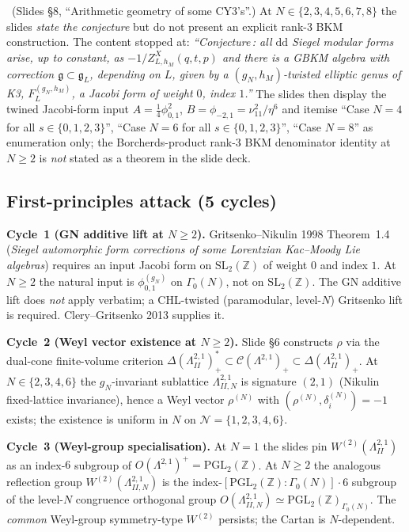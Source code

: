 \ClaimStatusConjectured\ (Slides \S 8, ``Arithmetic geometry of some
CY3's''.) At $N \in \{2, 3, 4, 5, 6, 7, 8\}$ the slides \emph{state the
conjecture} but do not present an explicit rank-$3$ BKM construction.
The content stopped at:
\emph{``Conjecture\,: all $\mathrm{dd}$ Siegel modular forms arise, up to
constant, as $-1/Z^X_{L, h_M}(q, t, p)$ and there is a GBKM algebra with
correction $\mathfrak{g} \subset \mathfrak{g}_L$, depending on $L$,
given by a $(g_N, h_M)$-twisted elliptic genus of K3,
$F^{(g_N, h_M)}_L$, a Jacobi form of weight $0$, index $1$.''}
The slides then display the twined Jacobi-form input
$A = \tfrac{1}{4} \phi^2_{0,1}$, $B = \phi_{-2,1} = \nu_{11}^2/\eta^6$
and itemise ``Case $N = 4$ for all $s \in \{0,1,2,3\}$'', ``Case $N = 6$
for all $s \in \{0,1,2,3\}$'', ``Case $N = 8$'' as enumeration only;
the Borcherds-product rank-$3$ BKM denominator identity at $N \geq 2$ is
\emph{not} stated as a theorem in the slide deck.

\subsection*{First-principles attack (5 cycles)}

\noindent\textbf{Cycle~1 (GN additive lift at $N \geq 2$).} Gritsenko--Nikulin
1998 Theorem~1.4 (\emph{Siegel automorphic form corrections of some
Lorentzian Kac--Moody Lie algebras}) requires an input Jacobi form on
$\mathrm{SL}_2(\mathbb{Z})$ of weight $0$ and index $1$. At $N \geq 2$ the
natural input is $\phi^{(g_N)}_{0,1}$ on $\Gamma_0(N)$, not on
$\mathrm{SL}_2(\mathbb{Z})$. The GN additive lift does \emph{not} apply
verbatim; a CHL-twisted (paramodular, level-$N$) Gritsenko lift is
required. Clery--Gritsenko 2013 supplies it.

\noindent\textbf{Cycle~2 (Weyl vector existence at $N \geq 2$).}
Slide \S 6 constructs $\rho$ via the dual-cone finite-volume criterion
$\Delta(\Lambda^{2,1}_{II})^{*}_{+} \subset \mathcal{C}(\Lambda^{2,1})_{+}
\subset \Delta(\Lambda^{2,1}_{II})_{+}$. At $N \in \{2,3,4,6\}$ the
$g_N$-invariant sublattice $\Lambda^{2,1}_{II,N}$ is signature $(2,1)$
(Nikulin fixed-lattice invariance), hence a Weyl vector
$\rho^{(N)}$ with $(\rho^{(N)}, \delta^{(N)}_i) = -1$ exists; the
existence is uniform in $N$ on $\mathcal{N} = \{1,2,3,4,6\}$.

\noindent\textbf{Cycle~3 (Weyl-group specialisation).} At $N=1$ the slides
pin $W^{(2)}(\Lambda^{2,1}_{II})$ as an index-$6$ subgroup of
$O(\Lambda^{2,1})^{+} = \mathrm{PGL}_2(\mathbb{Z})$. At $N \geq 2$ the
analogous reflection group $W^{(2)}(\Lambda^{2,1}_{II,N})$ is the
index-$[\mathrm{PGL}_2(\mathbb{Z}) : \Gamma_0(N)] \cdot 6$ subgroup of the
level-$N$ congruence orthogonal group
$O(\Lambda^{2,1}_{II,N}) \simeq \mathrm{PGL}_2(\mathbb{Z})_{\Gamma_0(N)}$.
The \emph{common} Weyl-group symmetry-type $W^{(2)}$ persists; the
Cartan is $N$-dependent.

